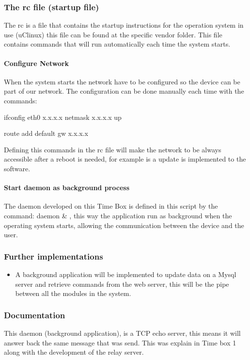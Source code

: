 \subsubsection{The rc file (startup file)}
The rc is a file that contains the startup instructions for the operation system in use (uClinux) this file can be found at the specific vendor folder. 
This file contains commands that will run automatically each time the system starts.
\paragraph{Configure Network}
When the system starts the network have to be configured so the device can be part of our network. The configuration can be done manually each time with the commands:

ifconfig eth0 x.x.x.x netmask x.x.x.x up

route add default gw x.x.x.x

Defining this commands in the rc file will make the network to be always accessible after a reboot is needed, for example is a update is implemented to the software. 

\paragraph{Start daemon as background process}
The daemon developed on this Time Box is defined in this script by the command: daemon & , this way the application run as background when the operating system starts, allowing the communication between the device and the user.

\subsubsection{Further implementations}
\begin{itemize}
	\item A background application will be implemented to update data on a Mysql server and retrieve commands from the web server, this will be the pipe between all the modules in the system.
\end{itemize}


\subsubsection{Documentation}
This daemon (background application), is a TCP echo server, this means it will answer back the same message that was send. This was explain in Time box 1 along with the development of the relay server. 

